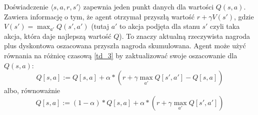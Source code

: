 \documentclass[a4paper, 12pt,oneside]{book}
\begin{document}
Doświadczenie $\langle s,a,r,s' \rangle$ zapewnia jeden punkt danych dla
wartości $Q(s,a)$. Zawiera informację o tym, że agent otrzymał przyszłą wartość
$r + \gamma V(s')$, gdzie $V(s') = \max_{a'}Q(s',a')$ (tutaj $a'$ to akcja
podjęta dla stanu $s'$ czyli taka akcja, która daje najlepszą wartość $Q$).
To znaczy aktualną rzeczywista nagroda plus dyskontowa
oszacowana przyszła nagroda skumulowana. Agent może użyć równania na różnicę
czasową \ref{td_3} by zaktualizować swoje oszacowanie dla $Q(s,a)$:
\begin{equation}
Q[s,a] := Q[s,a] + \alpha * \left(r + \gamma \max_{a'} Q[s',a'] -
Q[s,a]\right)
\label{qvalue_1}
\end{equation}
albo, równoważnie
\begin{equation}
Q[s,a] := (1 - \alpha) * Q[s,a] + \alpha * \left(r + \gamma \max_{a'}
Q[s',a'] \right)
\label{qvalue_2}
\end{equation}
\end{document}
